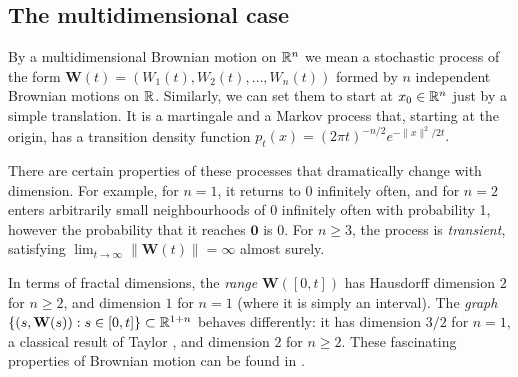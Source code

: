 \subsection{The multidimensional case}\label{subsec:multidimensional}


By a multidimensional Brownian motion on $\mathbb{R}^n$ we mean a stochastic process of the form  $\mathbf{W}(t) = (W_1(t),W_2(t),\dots,W_n(t))$ formed by $n$ independent Brownian motions on $\mathbb{R}$. Similarly, we can set them to start at $x_0\in \mathbb{R}^n$ just by a simple translation. It is a martingale and a Markov process that, starting at the origin, has a transition density function $p_t(x) = (2\pi t)^{-n/2}e^{-\lVert x \rVert^2 / 2t}.$

There are certain properties of these processes that dramatically change with dimension. For example, for $n= 1$, it returns to 0 infinitely often, and for $n= 2$ enters arbitrarily small neighbourhoods of $0$ infinitely often with probability 1, however the probability that it reaches $\mathbf{0}$ is $0$. For $n\geq 3$, the process is \emph{transient}, satisfying $\lim_{t\rightarrow \infty } \lVert \mathbf{W}(t) \rVert = \infty$ almost surely. 

In terms of fractal dimensions, the \emph{range} $\mathbf{W}([0,t])$ has Hausdorff dimension $2$ for $n \geq 2$, and dimension $1$ for $n=1$ (where it is simply an interval). The \emph{graph} $\{(s,\mathbf{W}(s)) : s\in [0,t]\} \subset \mathbb{R}^{1+n}$ behaves differently: it has dimension $3/2$ for $n = 1$, a classical result of Taylor \cite{taylor1953}, and dimension $2$ for $n \geq 2$. These fascinating properties of Brownian motion can be found in \cite{falconer2003}.


